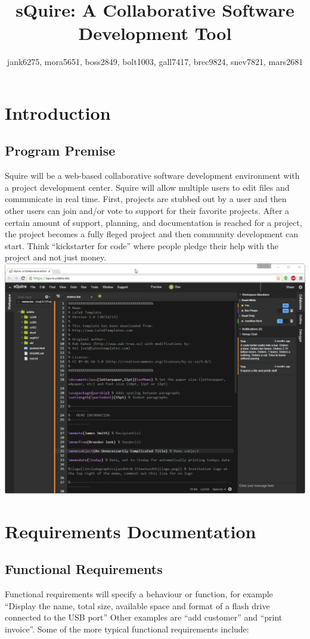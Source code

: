 \documentclass[11pt]{report}
\title{sQuire: A Collaborative Software Development Tool}
\author{jank6275, mora5651, boss2849, bolt1003, gall7417, brec9824, snev7821, mars2681}
\begin{document}
\maketitle

\tableofcontents

\chapter{Introduction}

\section{Program Premise}
        Squire will be a web-based collaborative software development environment with a project development center. Squire will allow multiple users to edit files and communicate in real time. First, projects are stubbed out by a user and then other users can join and/or vote to support for their favorite projects. After a certain amount of support, planning, and documentation is reached for a project, the project becomes a fully fleged project and then community development can start. Think ``kickstarter for code'' where people pledge their help with the project and not just money.
        \includegraphics[width=\textwidth]{squire}

\chapter{Requirements Documentation}

\section{Functional Requirements}
    Functional requirements will specify a behaviour or function, for example ``Display the name, total size, available space and format of a flash drive connected to the USB port'' Other examples are ``add customer'' and ``print invoice''. Some of the more typical functional requirements include:
    
\end{document}
